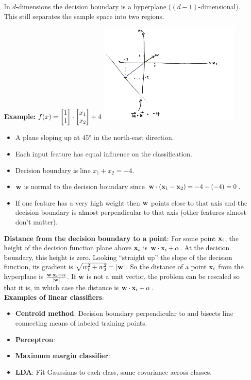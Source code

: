 \documentclass[12pt]{article}
\begin{document}
In $d$-dimensions the decision boundary is a hyperplane
($(d-1)$-dimensional). This still separates the sample space into two regions.

\textbf{Example:} $f(x) = \begin{bmatrix}1\\1\end{bmatrix} \cdot \begin{bmatrix}x_1\\x_2\end{bmatrix} + 4$
\includegraphics[width=200pt]{img/machine-learning-linear-decision-boundary.png}
\begin{itemize}
\item A plane sloping up at 45° in the north-east direction.
\item Each input feature has equal influence on the classification.
\item Decision boundary is line $x_1 + x_2 = -4$.
\item $\mathbf w$ is normal to the decision boundary since $\mathbf w \cdot (\mathbf x_1 - \mathbf x_2) = -4 - (-4) = 0$.
\item If one feature has a very high weight then $\mathbf w$ points close to that
  axis and the decision boundary is almost perpendicular to that axis (other
  features almost don't matter).
\end{itemize}

\textbf{Distance from the decision boundary to a point}: For some point $\mathbf x_i$,
the height of the decision function plane above $\mathbf x_i$ is
$\mathbf w \cdot \mathbf x_i + \alpha$. At the decision boundary, this height is
zero. Looking ``straight up'' the slope of the decision function, its gradient
is $\sqrt{w_1^2 + w_2^2} = |\mathbf w|$. So the distance of a point $\mathbf x_i$ from the
hyperplane is $\frac{\mathbf w \cdot \mathbf x_i + \alpha}{|\mathbf w|}$. If $\mathbf w$ is not a unit
vector, the problem can be rescaled so that it is, in which case the distance
is $\mathbf w \cdot \mathbf x_i + \alpha$.
\\

\textbf{Examples of linear classifiers}:
\begin{itemize}
\item \textbf{Centroid method}:  Decision boundary perpendicular to and bisects line
  connecting means of labeled training points.
\item \textbf{Perceptron}:
\item \textbf{Maximum margin classifier}:
\item \textbf{LDA}:  Fit Gaussians to each class, same covariance across classes.
\end{itemize}
\end{document}
